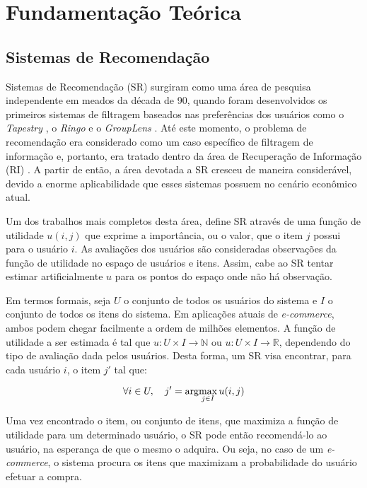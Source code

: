 \chapter{Fundamentação Teórica}
\label{cap:fundamentacao}

\section{Sistemas de Recomendação}
Sistemas de Recomendação (SR) surgiram como uma área de pesquisa independente em meados da década de 90, quando foram desenvolvidos os primeiros sistemas de filtragem baseados nas preferências dos usuários como o \textit{Tapestry} \citep{Goldberg:1992:UCF:138859.138867}, o \textit{Ringo} \citep{Shardanand:1995:SIF:223904.223931} e o \textit{GroupLens} \citep{Resnick:1994:GOA:192844.192905}. Até este momento, o problema de recomendação era considerado como um caso específico de filtragem de informação e, portanto, era tratado dentro da área de Recuperação de Informação (RI) \citep{Baeza-Yates:1999:MIR:553876}. A partir de então, a área devotada a SR cresceu de maneira considerável, devido a enorme aplicabilidade que esses sistemas possuem no cenário econômico atual.

Um dos trabalhos mais completos desta área, \citep{Adomavicius:2005:TNG:1070611.1070751} define SR através de uma função de utilidade $u(i,j)$ que exprime a importância, ou o valor, que o item $j$ possui para o usuário $i$. As avaliações dos usuários são consideradas observações da função de utilidade no espaço de usuários e itens. Assim, cabe ao SR tentar estimar artificialmente $u$ para os pontos do espaço onde não há observação. 

Em termos formais, seja $U$ o conjunto de todos os usuários do sistema e $I$ o conjunto de todos os itens do sistema. Em aplicações atuais de \textit{e-commerce}, ambos podem chegar facilmente a ordem de milhões elementos. A função de utilidade a ser estimada é tal que $u: U \times I \rightarrow \mathbb{N}$ ou $u: U \times I \rightarrow \mathbb{R}$, dependendo do tipo de avaliação dada pelos usuários. Desta forma, um SR visa encontrar, para cada usuário $i$, o item $j'$ tal que: 

\begin{equation}
\forall i \in U, \quad j' = \arg\!\max_{j \in I} u(i,j) 
\end{equation}

Uma vez encontrado o item, ou conjunto de itens, que maximiza a função de utilidade para um determinado usuário, o SR pode então recomendá-lo ao usuário, na esperança de que o mesmo o adquira. Ou seja, no caso de um \textit{e-commerce}, o sistema procura os itens que maximizam a probabilidade do usuário efetuar a compra.

